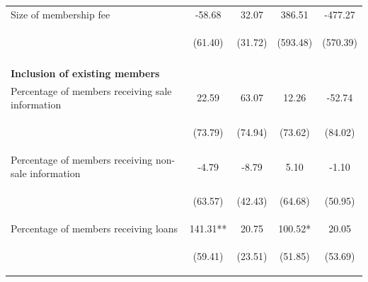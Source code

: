 \documentclass[11pt]{article}
\begin{document}
\begin{table}[H]
{\begin{tabularx}{1.3\linewidth}{lcccc}
\noalign{\smallskip}Size of membership fee & -58.68 & 32.07 & 386.51 & -477.27\\
 & \begin{footnotesize}(61.40)\end{footnotesize} & \begin{footnotesize}(31.72)\end{footnotesize} & \begin{footnotesize}(593.48)\end{footnotesize} & \begin{footnotesize}(570.39)\end{footnotesize}\\ \\
 
 \textbf{Inclusion of existing members} & & & & \\
\noalign{\smallskip}Percentage of members receiving sale information & 22.59 & 63.07 & 12.26 & -52.74\\
 & \begin{footnotesize}(73.79)\end{footnotesize} & \begin{footnotesize}(74.94)\end{footnotesize} & \begin{footnotesize}(73.62)\end{footnotesize} & \begin{footnotesize}(84.02)\end{footnotesize}\\
\noalign{\smallskip}Percentage of members receiving non-sale information & -4.79 & -8.79 & 5.10 & -1.10\\
 & \begin{footnotesize}(63.57)\end{footnotesize} & \begin{footnotesize}(42.43)\end{footnotesize} & \begin{footnotesize}(64.68)\end{footnotesize} & \begin{footnotesize}(50.95)\end{footnotesize}\\
\noalign{\smallskip}Percentage of members receiving loans & 141.31** & 20.75 & 100.52* & 20.05\\
 & \begin{footnotesize}(59.41)\end{footnotesize} & \begin{footnotesize}(23.51)\end{footnotesize} & \begin{footnotesize}(51.85)\end{footnotesize} & \begin{footnotesize}(53.69)\end{footnotesize}\\

\end{tabularx}}
\end{table}
\end{document}
